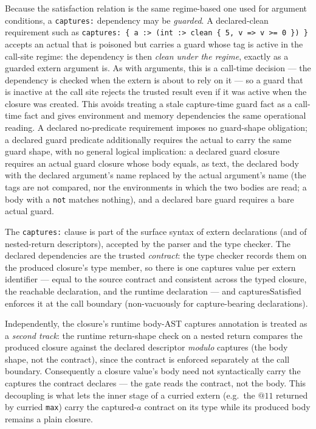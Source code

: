 \documentclass[12pt]{article}
\begin{document}
Because the satisfaction relation is the same regime-based one used for argument
conditions, a \texttt{captures:} dependency may be \emph{guarded}. A declared-clean
requirement such as \texttt{captures: \{ a :> (int :> clean \{ 5, v => v >= 0 \})
\}} accepts an actual that is poisoned but carries a guard whose tag is active in
the call-site regime: the dependency is then \emph{clean under the regime}, exactly
as a guarded extern argument is. As with arguments, this is a call-time decision
--- the dependency is checked when the extern is about to rely on it --- so a guard
that is inactive at the call site rejects the trusted result even if it was active
when the closure was created. This avoids treating a stale capture-time guard fact
as a call-time fact and gives environment and memory dependencies the same
operational reading. A declared no-predicate requirement imposes no guard-shape
obligation; a declared guard predicate additionally requires the actual to carry
the same guard shape, with no general logical implication: a declared guard
closure requires an actual guard closure whose body equals, as text, the
declared body with the declared argument's name replaced by the actual
argument's name (the tags are not compared, nor the environments in which the
two bodies are read; a body with a \texttt{not} matches nothing), and a
declared bare guard requires a bare actual guard.

The \texttt{captures:} clause is part of the surface syntax of extern
declarations (and of nested-return descriptors), accepted by the parser and the
type checker. The declared dependencies are the trusted \emph{contract}: the type
checker records them on the produced closure's type member, so there is one
captures value per extern identifier --- equal to the source contract and
consistent across the typed closure, the reachable declaration, and the runtime
declaration --- and \(\mathrm{capturesSatisfied}\) enforces it at the call boundary
(non-vacuously for capture-bearing declarations).

Independently, the closure's runtime body-AST captures annotation is treated as a
\emph{second track}: the runtime return-shape check on a nested return compares
the produced closure against the declared descriptor \emph{modulo} captures (the
body shape, not the contract), since the contract is enforced separately at the
call boundary. Consequently a closure value's body need not syntactically carry
the captures the contract declares --- the gate reads the contract, not the body.
This decoupling is what lets the inner stage of a curried extern (e.g.\ the
\(@11\) returned by curried \texttt{max}) carry the captured-\(a\) contract on its
type while its produced body remains a plain closure.
\end{document}
